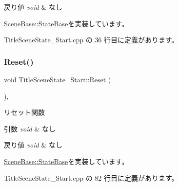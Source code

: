 \begin{DoxyRetVals}{戻り値}
{\em void} & なし \\
\hline
\end{DoxyRetVals}


\mbox{\hyperlink{class_scene_base_1_1_state_base_a33350231b039a2178c19beac0211c5b8}{Scene\+Base\+::\+State\+Base}}を実装しています。



 Title\+Scene\+State\+\_\+\+Start.\+cpp の 36 行目に定義があります。

\mbox{\label{class_title_scene_state___start_af4dfe902a4391ca8f0cff5d1aa9507f8}} 
\subsubsection{\texorpdfstring{Reset()}{Reset()}}
{\footnotesize\ttfamily void Title\+Scene\+State\+\_\+\+Start\+::\+Reset (\begin{DoxyParamCaption}{ }\end{DoxyParamCaption})\hspace{0.3cm}{\ttfamily [override]}, {\ttfamily [virtual]}}



リセット関数 


\begin{DoxyParams}{引数}
{\em void} & なし \\
\hline
\end{DoxyParams}

\begin{DoxyRetVals}{戻り値}
{\em void} & なし \\
\hline
\end{DoxyRetVals}


\mbox{\hyperlink{class_scene_base_1_1_state_base_a2e14a3afece0b1d8db9edcebf514a977}{Scene\+Base\+::\+State\+Base}}を実装しています。



 Title\+Scene\+State\+\_\+\+Start.\+cpp の 82 行目に定義があります。

\mbox{\label{class_title_scene_state___start_a5bcb4d7a9250ea1c0041c38616ffabfe}} 
